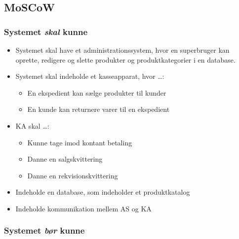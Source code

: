 \subsection{MoSCoW}

\subsubsection*{Systemet \textit{skal} kunne}

\begin{itemize}
	
	\item Systemet skal have et administrationssystem, hvor en superbruger kan oprette, redigere og slette produkter og produktkategorier i en database.
	\item Systemet skal indeholde et kasseapparat, hvor …:
	\begin{itemize}
		\item En ekspedient kan sælge produkter til kunder
		\item En kunde kan returnere varer til en ekspedient
	\end{itemize}
	\item \gls{KA} skal …:
	\begin{itemize}
		\item Kunne tage imod kontant betaling
		\item Danne en salgskvittering
		\item Danne en rekvisionskvittering
	\end{itemize}
	\item Indeholde en database, som indeholder et produktkatalog
	\item Indeholde kommunikation mellem \gls{AS} og \gls{KA}
	
\end{itemize}


\subsubsection*{Systemet \textit{bør} kunne}

